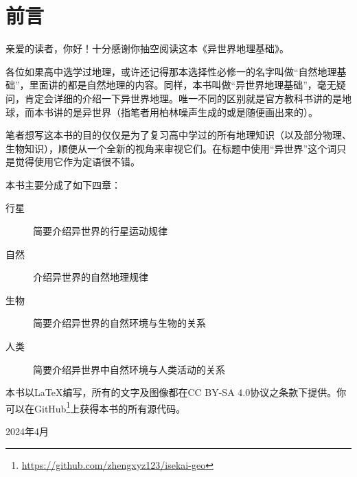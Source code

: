 \section*{前言}
亲爱的读者，你好！十分感谢你抽空阅读这本《异世界地理基础》。

各位如果高中选学过地理，或许还记得那本选择性必修一的名字叫做“自然地理基础”，里面讲的都是自然地理的内容。同样，本书叫做“异世界地理基础”，毫无疑问，肯定会详细的介绍一下异世界地理。唯一不同的区别就是官方教科书讲的是地球，而本书讲的是异世界（指笔者用柏林噪声生成的或是随便画出来的）。

笔者想写这本书的目的仅仅是为了复习高中学过的所有地理知识（以及部分物理、生物知识），顺便从一个全新的视角来审视它们。在标题中使用“异世界”这个词只是觉得使用它作为定语很不错。

本书主要分成了如下四章：
\begin{description}
    \item[行星] 简要介绍异世界的行星运动规律
    \item[自然] 介绍异世界的自然地理规律
    \item[生物] 简要介绍异世界的自然环境与生物的关系
    \item[人类] 简要介绍异世界中自然环境与人类活动的关系
\end{description}

本书以\LaTeX 编写，所有的文字及图像都在CC BY-SA 4.0协议之条款下提供。你可以在GitHub\footnote{\url{https://github.com/zhengxyz123/isekai-geo}}上获得本书的所有源代码。

\begin{flushright}
    2024年4月
\end{flushright}
